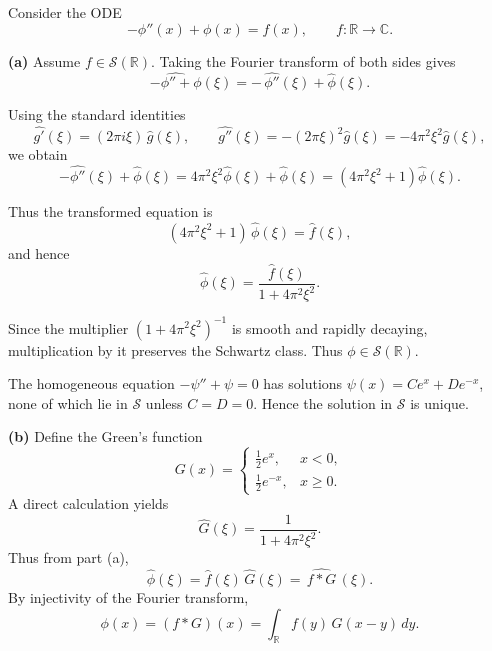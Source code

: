 \begin{problem}[CP-III-0022]
\label{prob:cp-iii-0022}
Consider the ODE
\begin{equation}
	-\phi''(x) + \phi(x) = f(x), \qquad f:\mathbb{R}\to\mathbb{C}.
\end{equation}

\par\smallskip\noindent\textbf{(a)}\quad
Assume $f\in\mathcal{S}(\mathbb{R})$.
Taking the Fourier transform of both sides gives
\[
\widehat{-\phi'' + \phi}(\xi)
= -\,\widehat{\phi''}(\xi) + \widehat{\phi}(\xi).
\]

Using the standard identities
\[
\widehat{g'}(\xi) = (2\pi i\xi)\,\widehat{g}(\xi),
\qquad
\widehat{g''}(\xi) = -(2\pi\xi)^{2}\widehat{g}(\xi)
= -4\pi^{2}\xi^{2}\widehat{g}(\xi),
\]
we obtain
\[
-\widehat{\phi''}(\xi) + \widehat{\phi}(\xi)
= 4\pi^{2}\xi^{2}\widehat{\phi}(\xi) + \widehat{\phi}(\xi)
= (4\pi^{2}\xi^{2} + 1)\widehat{\phi}(\xi).
\]

Thus the transformed equation is
\[
(4\pi^{2}\xi^{2} + 1)\,\widehat{\phi}(\xi) = \widehat{f}(\xi),
\]
and hence
\[
\boxed{
	\widehat{\phi}(\xi)
	= \frac{\widehat{f}(\xi)}{1 + 4\pi^{2}\xi^{2}}.
}
\]

Since the multiplier $(1+4\pi^{2}\xi^{2})^{-1}$ is smooth and rapidly decaying,
multiplication by it preserves the Schwartz class.
Thus $\phi\in\mathcal{S}(\mathbb{R})$.

The homogeneous equation $-\psi''+\psi=0$ has solutions
$\psi(x)=Ce^{x}+De^{-x}$, none of which lie in $\mathcal{S}$ unless $C=D=0$.
Hence the solution in $\mathcal{S}$ is unique.

\par\smallskip\noindent\textbf{(b)}\quad
Define the Green's function
\[
G(x) =
\begin{cases}
	\frac12 e^{x}, & x<0,\\[0.3em]
	\frac12 e^{-x}, & x\ge 0.
\end{cases}
\]
A direct calculation yields
\[
\widehat{G}(\xi)
= \frac{1}{1+4\pi^{2}\xi^{2}}.
\]
Thus from part (a),
\[
\widehat{\phi}(\xi)
= \widehat{f}(\xi)\,\widehat{G}(\xi)
= \widehat{\,f*G\,}(\xi).
\]
By injectivity of the Fourier transform,
\[
\boxed{
	\phi(x) = (f*G)(x)
	= \int_{\mathbb{R}} f(y)\,G(x-y)\,dy.
}
\]
\end{problem}

